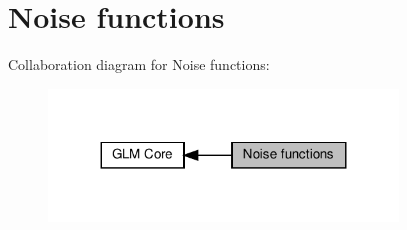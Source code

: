 \hypertarget{group__core__func__noise}{}\section{Noise functions}
\label{group__core__func__noise}
Collaboration diagram for Noise functions\+:\nopagebreak
\begin{figure}[H]
\begin{center}
\leavevmode
\includegraphics[width=263pt]{group__core__func__noise}
\end{center}
\end{figure}

